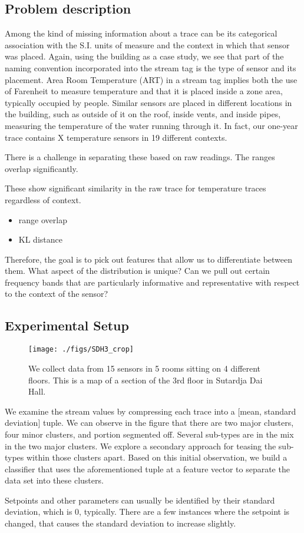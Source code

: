 
\subsection{Problem description}
Among the kind of missing information about a trace can be its categorical association with the S.I. units of measure
and the context in which that sensor was placed.  Again, using the building as a case study, we see that part of the 
naming convention incorporated into the stream tag is the type of sensor and its placement.  Area Room Temperature (ART)
in a stream tag implies both the use of Farenheit to measure temperature and that it is placed inside a zone area,
typically occupied by people.  Similar sensors are placed in different locations in the building, such as outside of it
on the roof, inside vents, and inside pipes, measuring the temperature of the water running through it.  In fact, our
one-year trace contains X temperature sensors in 19 different contexts.

There is a challenge in separating these based on raw readings.  The ranges overlap significantly.

These show significant similarity in the raw trace for temperature traces regardless of context.
\begin{itemize}
\item range overlap
\item KL distance
\end{itemize}

Therefore, the goal is to pick out features that allow us to differentiate between them.  What aspect of the distribution is unique?
Can we pull out certain frequency bands that are particularly informative and representative with respect to the context of
the sensor?

\subsection{Experimental Setup}
\begin{figure}[h!]
\centering
  \texttt{[image: ./figs/SDH3\_crop]}
\caption{We collect data from 15 sensors in 5 rooms sitting on 4 different floors. This is a map of a section of the 3rd floor
in Sutardja Dai Hall.}
\label{fig:sdh}
\end{figure}

We examine the stream values by compressing each trace into a [mean, standard deviation] tuple.  We can observe in the figure that there 
are two major clusters, four minor clusters, and portion segmented off.  Several sub-types are in the mix in the two major clusters.
We explore a secondary approach for teasing the sub-types within those clusters apart.  Based on this initial observation, we build a
classifier that uses the aforementioned tuple at a feature vector to separate the data set into these clusters.

Setpoints and other parameters can usually be identified by their standard deviation, which is 0, typically.  There are a few instances where 
the setpoint is changed, that causes the standard deviation to increase slightly.
